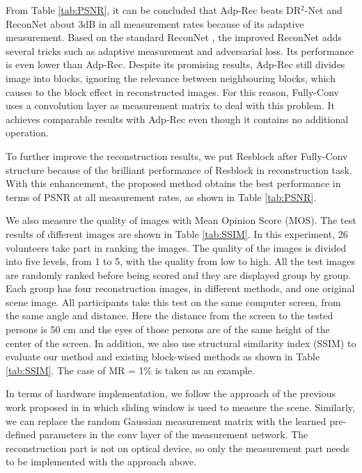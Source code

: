\documentclass[review]{elsarticle}
\begin{document}
From Table \ref{tab:PSNR}, it can be concluded that Adp-Rec beats DR$^2$-Net and ReconNet about 3dB in all measurement rates because of its adaptive measurement. Based on the standard ReconNet \cite{kulkarni2016reconnet}, the improved ReconNet \cite{lohit2017convolutional} adds several tricks such as adaptive measurement and adversarial loss. Its performance is even lower than Adp-Rec. Despite its promising results, Adp-Rec still divides image into blocks, ignoring the relevance between neighbouring blocks, which causes to the block effect in reconstructed images. For this reason, Fully-Conv uses a convolution layer as measurement matrix to deal with this problem. It achieves comparable results with Adp-Rec even though it contains no additional operation.

To further improve the reconstruction results, we put Resblock after Fully-Conv structure because of the brilliant performance of Resblock in reconstruction task. With this enhancement, the proposed method obtains the best performance in terms of PSNR at all measurement rates, as shown in Table \ref{tab:PSNR}.

We also measure the quality of images with Mean Opinion Score (MOS). The test results of different images are shown in Table \ref{tab:SSIM}. In this experiment, 26 volunteers take part in ranking the images. The quality of the images is divided into five levels, from 1 to 5, with the quality from low to high. All the test images are randomly ranked before being scored and they are displayed group by group. Each group has four reconstruction images, in different methods, and one original scene image. All participants take this test on the same computer screen, from the same angle and distance. Here the distance from the screen to the tested persons is 50 cm and the eyes of those persons are of the same height of the center of the screen. In addition, we also use structural similarity index (SSIM) to evaluate our method and existing block-wised methods as shown in Table \ref{tab:SSIM}. The case of MR = 1\% is taken as an example.

In terms of hardware implementation, we follow the approach of the previous work proposed in \cite{shi2011high} in which sliding window is used to measure the scene. Similarly, we can replace the random Gaussian measurement matrix with the learned pre-defined  parameters in the conv layer of the measurement network. The reconstruction part is not on optical device, so only the measurement part needs to be implemented with the approach above.
\end{document}
